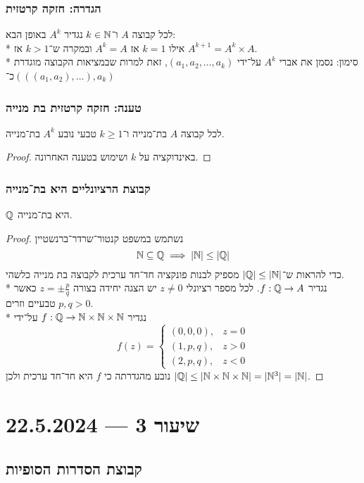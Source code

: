 \subsubsection{הגדרה: חזקה קרטזית}
לכל קבוצה $A$ ו־$k \in \mathbb{N}$ נגדיר $A^k$ באופן הבא: \\*
אילו $k = 1$ אז $A^k = A$ ובמקרה ש־$k > 1$ אז $A^{k + 1} = A^k \times A$. \\*
סימון: נסמן את אברי $A^k$ על־ידי $(a_1, a_2, \hdots, a_k)$, זאת למרות שבמציאות הקבוצה מוגדרת כ־$(((a_1, a_2), \hdots), a_k)$

\subsubsection{טענה: חזקה קרטזית בת מנייה}
לכל קבוצה $A$ בת־מנייה ו־$k \ge 1$ טבעי נובע $A^k$ בת־מנייה.
\begin{proof}
	באינדוקציה על $k$ ושימוש בטענה האחרונה.
\end{proof}

\subsubsection{קבוצת הרציונליים היא בת־מנייה}
$\mathbb{Q}$ היא בת־מנייה.
\begin{proof}
	נשתמש במשפט קנטור־שרדר־ברנשטיין
	\[
		\mathbb{N} \subseteq \mathbb{Q} \implies |\mathbb{N}| \le |\mathbb{Q}|
	\]
	כדי להראות ש־$|\mathbb{Q}| \le |\mathbb{N}|$ מספיק לבנות פונקציה חד־חד ערכית לקבוצה בת מנייה כלשהי. \\*
	נגדיר $f : \mathbb{Q} \to A$. לכל מספר רציונלי $z \ne 0$ יש הצגה יחידה בצורה $z = \pm \frac{p}{q}$ כאשר $p, q > 0$ טבעיים וזרים. \\*
	נגדיר $f : \mathbb{Q} \to \mathbb{N} \times \mathbb{N} \times \mathbb{N}$ על־ידי
	\[
		f(z) = \begin{cases}
			(0, 0, 0), & z = 0 \\
			(1, p, q), & z > 0 \\
			(2, p, q), & z < 0
		\end{cases}
	\]
	נובע מהגדרתה כי $f$ היא חד־חד ערכית ולכן $|\mathbb{Q}| \le |\mathbb{N} \times \mathbb{N} \times \mathbb{N}| = |\mathbb{N}^3| = |\mathbb{N}|$.
\end{proof}

\section{שיעור 3 --- 22.5.2024}
\subsection{קבוצת הסדרות הסופיות}
